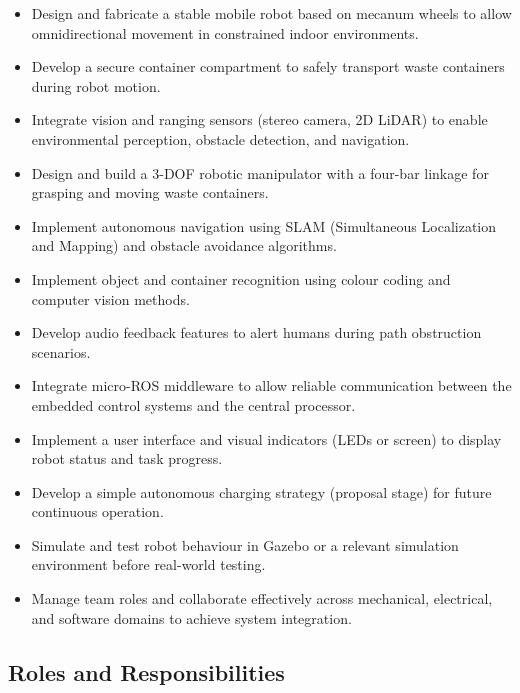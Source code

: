 \documentclass{article}
\begin{document}
\begin{itemize}
\item Design and fabricate a stable mobile robot based on mecanum wheels to allow omnidirectional movement in constrained indoor environments.

\item Develop a secure container compartment to safely transport waste containers during robot motion.

\item Integrate vision and ranging sensors (stereo camera, 2D LiDAR) to enable environmental perception, obstacle detection, and navigation.

\item Design and build a 3-DOF robotic manipulator with a four-bar linkage for grasping and moving waste containers.

\item Implement autonomous navigation using SLAM (Simultaneous Localization and Mapping) and obstacle avoidance algorithms.

\item Implement object and container recognition using colour coding and computer vision methods.

\item Develop audio feedback features to alert humans during path obstruction scenarios.

\item Integrate micro-ROS middleware to allow reliable communication between the embedded control systems and the central processor.

\item Implement a user interface and visual indicators (LEDs or screen) to display robot status and task progress.

\item Develop a simple autonomous charging strategy (proposal stage) for future continuous operation.

\item Simulate and test robot behaviour in Gazebo or a relevant simulation environment before real-world testing.

\item Manage team roles and collaborate effectively across mechanical, electrical, and software domains to achieve system integration.

\end{itemize}

\subsection{Roles and Responsibilities}
\end{document}
